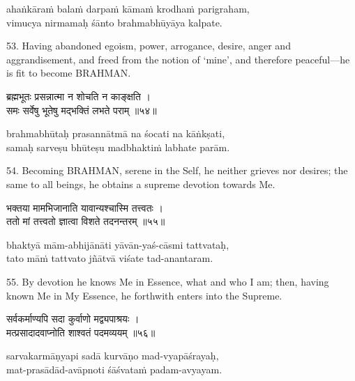 \begin{transliteration}
ahaṅkāraṁ balaṁ darpaṁ kāmaṁ krodhaṁ parigraham, \\
vimucya nirmamaḥ śānto brahmabhūyāya kalpate.
\end{transliteration}

53. Having abandoned egoism, power, arrogance, desire, anger and
aggrandisement, and freed from the notion of `mine', and therefore
peaceful---he is fit to become BRAHMAN.\@

\begin{gitaverse}
ब्रह्मभूतः प्रसन्नात्मा न शोचति न काङ्क्षति । \\
समः सर्वेषु भूतेषु मद्भक्तिं लभते पराम् ॥५४॥
\end{gitaverse}

\begin{transliteration}
brahmabhūtaḥ prasannātmā na śocati na kāṅkṣati, \\
samaḥ sarveṣu bhūteṣu madbhaktiṁ labhate parām.
\end{transliteration}

54. Becoming BRAHMAN, serene in the Self, he neither grieves nor desires; the
same to all beings, he obtains a supreme devotion towards Me.

\begin{gitaverse}
भक्तया मामभिजानाति यावान्यश्चास्मि तत्त्वतः । \\
ततो मां तत्त्वतो ज्ञात्वा विशते तदनन्तरम् ॥५५॥
\end{gitaverse}

\begin{transliteration}
bhaktyā mām-abhijānāti yāvān-yaś-cāsmi tattvataḥ, \\
tato māṁ tattvato jñātvā viśate tad-anantaram.
\end{transliteration}

55. By devotion he knows Me in Essence, what and who I am; then, having known
Me in My Essence, he forthwith enters into the Supreme.

\begin{gitaverse}
सर्वकर्माण्यपि सदा कुर्वाणो मद्व्यपाश्रयः । \\
मत्प्रसादादवाप्नोति शाश्वतं पदमव्ययम् ॥५६॥
\end{gitaverse}

\begin{transliteration}
sarvakarmāṇyapi sadā kurvāṇo mad-vyapāśrayaḥ, \\
mat-prasādād-avāpnoti śāśvataṁ padam-avyayam.
\end{transliteration}

